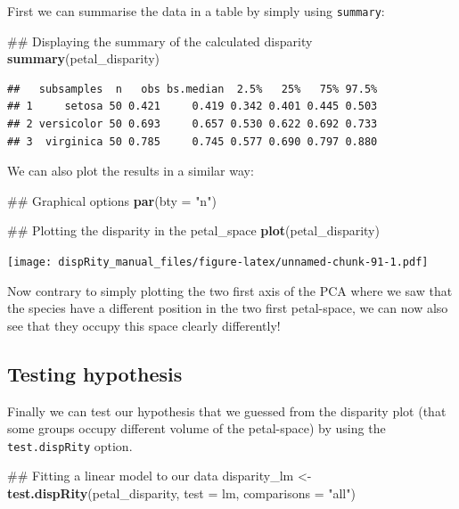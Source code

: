 \documentclass[]{book}
\newenvironment{Shaded}{\begin{snugshade}}{\end{snugshade}}
\newcommand{\KeywordTok}[1]{\textcolor[rgb]{0.13,0.29,0.53}{\textbf{#1}}}
\newcommand{\DataTypeTok}[1]{\textcolor[rgb]{0.13,0.29,0.53}{#1}}
\newcommand{\StringTok}[1]{\textcolor[rgb]{0.31,0.60,0.02}{#1}}
\newcommand{\NormalTok}[1]{#1}
\theoremstyle{definition}
\theoremstyle{definition}
\theoremstyle{remark}
\begin{document}
First we can summarise the data in a table by simply using
\texttt{summary}:

\begin{Shaded}
\begin{Highlighting}[]
\NormalTok{## Displaying the summary of the calculated disparity}
\KeywordTok{summary}\NormalTok{(petal_disparity)}
\end{Highlighting}
\end{Shaded}

\begin{verbatim}
##   subsamples  n   obs bs.median  2.5%   25%   75% 97.5%
## 1     setosa 50 0.421     0.419 0.342 0.401 0.445 0.503
## 2 versicolor 50 0.693     0.657 0.530 0.622 0.692 0.733
## 3  virginica 50 0.785     0.745 0.577 0.690 0.797 0.880
\end{verbatim}

We can also plot the results in a similar way:

\begin{Shaded}
\begin{Highlighting}[]
\NormalTok{## Graphical options}
\KeywordTok{par}\NormalTok{(}\DataTypeTok{bty =} \StringTok{"n"}\NormalTok{)}

\NormalTok{## Plotting the disparity in the petal_space}
\KeywordTok{plot}\NormalTok{(petal_disparity)}
\end{Highlighting}
\end{Shaded}

\texttt{[image: dispRity\_manual\_files/figure-latex/unnamed-chunk-91-1.pdf]}

Now contrary to simply plotting the two first axis of the PCA where we
saw that the species have a different position in the two first
petal-space, we can now also see that they occupy this space clearly
differently!

\subsection{Testing hypothesis}\label{testing-hypothesis}

Finally we can test our hypothesis that we guessed from the disparity
plot (that some groups occupy different volume of the petal-space) by
using the \texttt{test.dispRity} option.

\begin{Shaded}
\begin{Highlighting}[]
\NormalTok{## Fitting a linear model to our data}
\NormalTok{disparity_lm <-}\StringTok{ }\KeywordTok{test.dispRity}\NormalTok{(petal_disparity, }\DataTypeTok{test =}\NormalTok{ lm, }\DataTypeTok{comparisons =} \StringTok{"all"}\NormalTok{)}
\end{Highlighting}
\end{Shaded}
\end{document}
